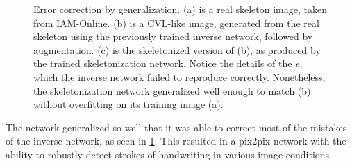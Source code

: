 \begin{figure}
  \centering
  \caption[Error correction by generalization]{Error correction by generalization. (a) is a real skeleton image, taken from IAM-Online. (b) is a CVL-like image, generated from the real skeleton using the previously trained inverse network, followed by augmentation. (c) is the skeletonized version of (b), as produced by the trained skeletonization network. Notice the details of the \emph{e}, which the inverse network failed to reproduce correctly. Nonetheless, the skeletonization network generalized well enough to match (b) without overfitting on its training image (a).}
  \label{fig:skeletonizeTrainResult}
\end{figure}

The network generalized so well that it was able to correct most of the mistakes of the inverse network, as seen in \cref{fig:skeletonizeTrainResult}. This resulted in a \gls{pix2pix} network with the ability to robustly detect strokes of handwriting in various image conditions.


